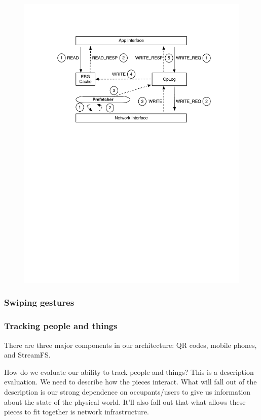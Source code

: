 \begin{figure}[htb!]
\begin{center}
\includegraphics[scale=0.50]{figs/standard_interaction}
\caption{}
\label{fig:interactions}
\end{center}
\end{figure}


\subsubsection{Swiping gestures}
\label{sec:swipes}

\subsubsection{Tracking people and things}
There are three major components in our architecture: QR codes, mobile phones, and StreamFS.

How do we evaluate our ability to track people and things?
This is a description evaluation.  We need to describe how the pieces interact.  What will fall out of the description is our strong dependence on occupants/users to give us information about the state of the physical world.  It’ll also fall out that what allows these pieces to fit together is network infrastructure.







